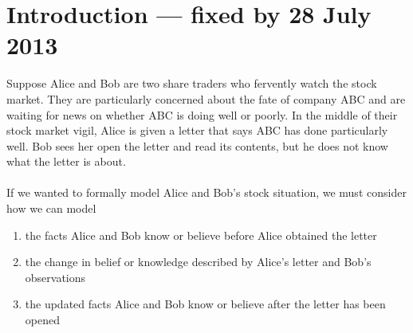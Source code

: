 \section{Introduction --- fixed by 28 July 2013}

% 
% 
% 

Suppose Alice and Bob are two share traders who fervently watch the stock market. They
are particularly concerned about the fate of company ABC and are waiting for news on whether ABC is
doing well or poorly. In the middle of their stock market vigil, Alice is given a letter that says
ABC has done particularly well. Bob sees her open the letter and read its contents, but he does not
know what the letter is about.\\
\\
If we wanted to formally model Alice and Bob's stock situation, we must consider how we can model
\begin{enumerate}
	\item the facts Alice and Bob know or believe before Alice obtained the letter
	\item the change in belief or knowledge described by Alice's letter and Bob's observations
	\item the updated facts Alice and Bob know or believe after the letter has been opened
\end{enumerate}

